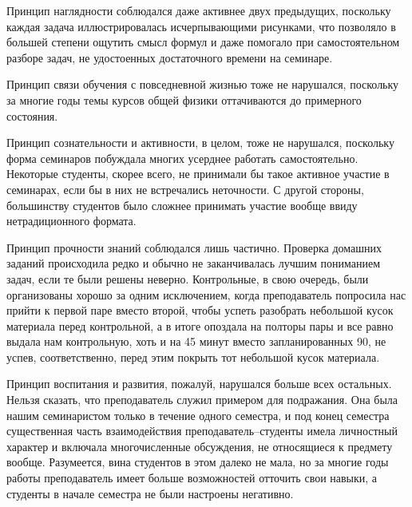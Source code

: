 \documentclass[a4paper, 12pt]{article}
\begin{document}
Принцип наглядности соблюдался даже активнее двух предыдущих, поскольку 
каждая задача иллюстрировалась исчерпывающими рисунками, что позволяло 
в большей степени ощутить смысл формул и даже помогало при 
самостоятельном разборе задач, не удостоенных достаточного времени на 
семинаре.

Принцип связи обучения с повседневной жизнью тоже не нарушался, 
поскольку за многие годы темы курсов общей физики оттачиваются до 
примерного состояния.

Принцип сознательности и активности, в целом, тоже не нарушался, 
поскольку форма семинаров побуждала многих усерднее работать 
самостоятельно. Некоторые студенты, скорее всего, не принимали бы такое 
активное участие в семинарах, если бы в них не встречались неточности. 
С другой стороны, большинству студентов было сложнее принимать участие 
вообще ввиду нетрадиционного формата.

Принцип прочности знаний соблюдался лишь частично. Проверка домашних 
заданий происходила редко и обычно не заканчивалась лучшим пониманием 
задач, если те были решены неверно. Контрольные, в свою очередь, были 
организованы хорошо за одним исключением, когда преподаватель попросила 
нас прийти к первой паре вместо второй, чтобы успеть разобрать небольшой 
кусок материала перед контрольной, а в итоге опоздала на полторы пары 
и все равно выдала нам контрольную, хоть и на 45 минут вместо 
запланированных 90, не успев, соответственно, перед этим покрыть тот 
небольшой кусок материала.

Принцип воспитания и развития, пожалуй, нарушался больше всех остальных. 
Нельзя сказать, что преподаватель служил примером для подражания. Она 
была нашим семинаристом только в течение одного семестра, и под конец 
семестра существенная часть взаимодействия преподаватель--студенты имела 
личностный характер и включала многочисленные обсуждения, не относящиеся 
к предмету вообще. Разумеется, вина студентов в этом далеко не мала, но 
за многие годы работы преподаватель имеет больше возможностей отточить 
свои навыки, а студенты в начале семестра не были настроены негативно.


\end{document}
